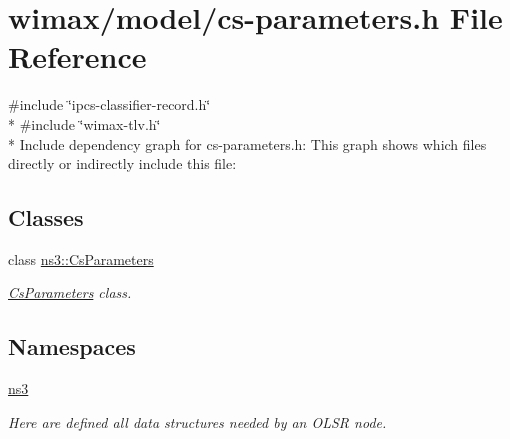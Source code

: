 \hypertarget{cs-parameters_8h}{}\section{wimax/model/cs-\/parameters.h File Reference}
\label{cs-parameters_8h}
{\ttfamily \#include \char`\"{}ipcs-\/classifier-\/record.\+h\char`\"{}}\\*
{\ttfamily \#include \char`\"{}wimax-\/tlv.\+h\char`\"{}}\\*
Include dependency graph for cs-\/parameters.h\+:
This graph shows which files directly or indirectly include this file\+:
\subsection*{Classes}
\begin{DoxyCompactItemize}
\item 
class \hyperlink{classns3_1_1CsParameters}{ns3\+::\+Cs\+Parameters}
\begin{DoxyCompactList}\small\item\em \hyperlink{classns3_1_1CsParameters}{Cs\+Parameters} class. \end{DoxyCompactList}\end{DoxyCompactItemize}
\subsection*{Namespaces}
\begin{DoxyCompactItemize}
\item 
 \hyperlink{namespacens3}{ns3}
\begin{DoxyCompactList}\small\item\em Here are defined all data structures needed by an O\+L\+SR node. \end{DoxyCompactList}\end{DoxyCompactItemize}
